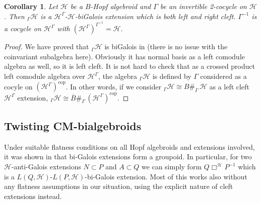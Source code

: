 \documentclass[a4paper,reqno]{amsart}
\numberwithin{equation}{section}
\theoremstyle{plain}
\newtheorem{cor}[thm]{Corollary}
\theoremstyle{remark}
\numberwithin{equation}{section}
\newcommand\inv{^{-1}}
\newcommand{\BB}{\overline{B}}
\newcommand{\CH}{\mathcal{H}}
\newcommand\cop{{\operatorname{cop}}}
\begin{document}
\begin{cor}\label{lem. two side cleft extensions}
   Let $\CH$ be a $B$-Hopf algebroid and $\Gamma$ be an invertible 2-cocycle on $\CH$. Then ${}_{\Gamma}\CH$ is a $\CH^\Gamma$-$\CH$-biGalois extension which is both left and right cleft. $\Gamma\inv$ is a cocycle on $\CH^\Gamma$ with $(\CH^\Gamma)^{\Gamma\inv}=\CH$.
\end{cor}
\begin{proof}
    We have proved that ${{}_{\Gamma}\CH}$ is biGalois in  (there is no issue with the coinvariant subalgebra here). Obviously it has normal basis as a left comodule algebra as well, so it is left cleft. It is not hard to check that as a crossed product left comodule algebra over $\CH^\Gamma$, the algebra $_\Gamma\CH$ is defined by $\Gamma$ considered as a cocyle on $(\CH^\Gamma)^\cop$.  In other words, if we consider $_\Gamma\CH\cong B\#_{\Gamma}\,\CH$ as a left cleft $\CH^{\Gamma}$ extension, $_\Gamma\CH\cong \BB\#_{\Gamma}\,(\CH^{\Gamma})^{\cop}$.
\end{proof}






\subsection{Twisting CM-bialgebroids}
Under suitable flatness conditions on all Hopf algebroids and extensions involved, it was shown in \cite{HS25} that bi-Galois extensions form a groupoid. In particular, for two $\CH$-anti-Galois extensions $N\subset P$ and $A\subset Q$ we can simply form $Q\Box^\CH P\inv$  which is a $L(Q,\CH)$-$L(P,\CH)$-bi-Galois extension. Most of this works also without any flatness assumptions in our situation, using the explicit nature of cleft extensions instead.
\end{document}
